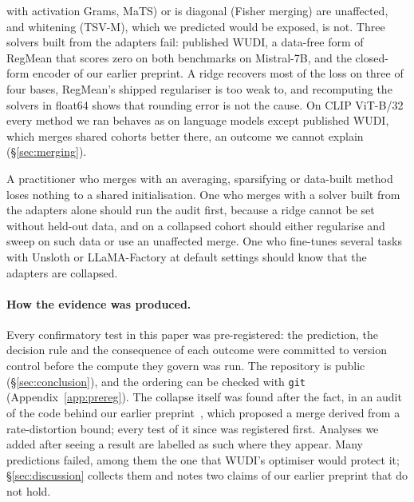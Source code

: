 \begin{enumerate}[leftmargin=*,itemsep=2pt,topsep=3pt]
with activation Grams, MaTS) or is diagonal (Fisher merging) are unaffected,
and whitening (TSV-M), which we predicted would be exposed, is not. Three
solvers built from the adapters fail: published WUDI, a data-free form of
RegMean that scores zero on both benchmarks on Mistral-7B, and the closed-form
encoder of our earlier preprint. A ridge recovers most of the loss on three of
four bases, RegMean's shipped regulariser is too weak to, and recomputing the
solvers in float64 shows that rounding error is not the cause. On CLIP
ViT-B/32 every method we ran behaves as on language models except published
WUDI,
which merges shared cohorts better there, an outcome we cannot explain
(\S\ref{sec:merging}).
\end{enumerate}

A practitioner who merges with an averaging, sparsifying or data-built method
loses nothing to a shared initialisation. One who merges with a solver built
from the adapters alone should run the audit first, because a ridge cannot be
set without held-out data, and on a collapsed cohort should either regularise
and sweep on such data or use an unaffected merge. One who fine-tunes several
tasks with Unsloth or LLaMA-Factory at default settings should know that the
adapters are collapsed.

\paragraph{How the evidence was produced.} Every confirmatory test in this
paper was pre-registered: the prediction, the decision rule and the
consequence of each outcome were committed to version control before the
compute they govern was run. The repository is public (\S\ref{sec:conclusion}),
and the ordering can be checked with \texttt{git} (Appendix~\ref{app:prereg}).
The collapse itself was found after the fact, in an audit of the code behind
our earlier preprint~\citep{pathak2026rd}, which proposed a merge derived from
a rate-distortion bound; every test of it since was registered first. Analyses
we added after seeing a result are labelled as such where they appear. Many
predictions failed, among them the one that WUDI's optimiser would protect it;
\S\ref{sec:discussion} collects them and notes two claims of our earlier
preprint that do not hold.
